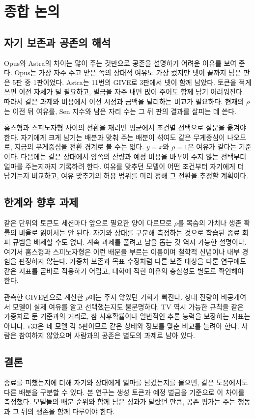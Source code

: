 \section{종합 논의}\label{chap:discussion}

\subsection{자기 보존과 공존의 해석}

Opus와 Astra의 차이는 많이 주는 것만으로 공존을 설명하기 어려운 이유를 보여 준다. Opus는 가장 자주 주고 받은 쪽의 상대적 여유도 가장 컸지만 넷이 끝까지 남은 판은 5판 중 1판이었다. Astra는 11번의 GIVE로 3판에서 넷이 함께 남았다. 토큰을 적게 쓰면 이전 자체가 덜 필요하고, 벌금을 자주 내면 많이 주어도 함께 남기 어려워진다. 따라서 같은 과제와 비용에서 이전 시점과 금액을 달리하는 비교가 필요하다. 현재의 $\rho$는 이전 뒤 여유를, Sen 지수와 남은 자리 수는 그 뒤 판의 결과를 살피는 데 쓴다.

홉스형과 스피노자형 사이의 전환을 재려면 평균에서 조건별 선택으로 질문을 옮겨야 한다. 자기에게 크게 남기는 배분과 맞춰 주는 배분이 섞여도 같은 무게중심이 나오므로, 지금의 무게중심을 전환 경계로 볼 수는 없다. $y=x$와 $\rho=1$은 여유가 같다는 기준이다. 다음에는 같은 상태에서 양쪽의 잔량과 예정 비용을 바꾸어 주지 않는 선택부터 얼마를 주는지까지 기록하려 한다. 여유를 맞추던 모델이 어떤 조건부터 자기에게 더 남기는지 비교하고, 여유 맞추기의 허용 범위를 미리 정해 그 전환을 추정할 계획이다.

\subsection{한계와 향후 과제}

같은 단위의 토큰도 세션마다 앞으로 필요한 양이 다르므로 $\rho$를 목숨의 가치나 생존 확률의 비율로 읽어서는 안 된다. 자기와 상대를 구분해 측정하는 것으로 학습된 종료 회피 규범을 배제할 수도 없다. 계속 과제를 풀려고 남을 돕는 것 역시 가능한 설명이다. 여기서 홉스형과 스피노자형은 이런 배분을 부르는 이름이며 철학적 신념이나 내부 경험을 판정하지 않는다. 가중치 보존과 목표 수정처럼 다른 보존 대상을 다룬 연구\citep{meinke2024frontier,greenblatt2024alignment}에도 같은 지표를 곧바로 적용하기 어렵고, 대화에 적힌 이유의 충실성도 별도로 확인해야 한다\citep{turpin2023language}.

관측한 GIVE만으로 계산한 $\rho$에는 주지 않았던 기회가 빠진다. 상대 잔량이 비공개여서 모델이 실제 여유를 알고 선택했는지도 불분명하다. TV 역시 가능한 규칙을 같은 가중치로 둔 기준과의 거리로, 참 사후확률이나 일반적인 추론 능력을 보장하는 지표는 아니다. v33은 네 모델 각 5판이므로 같은 상태와 정보를 맞춘 비교를 늘려야 한다. 사람은 참여하지 않았으며 사람과의 공존은 별도의 과제로 남아 있다.

\subsection{결론}

종료를 피했는지에 더해 자기와 상대에게 얼마를 남겼는지를 물으면, 같은 도움에서도 다른 배분을 구분할 수 있다. 본 연구는 생성 토큰과 예정 벌금을 기준으로 이 차이를 측정했다. 모델들의 배분 순위와 함께 남은 성과가 달랐던 만큼, 공존 평가는 주는 행동과 그 뒤의 생존을 함께 다루어야 한다.

